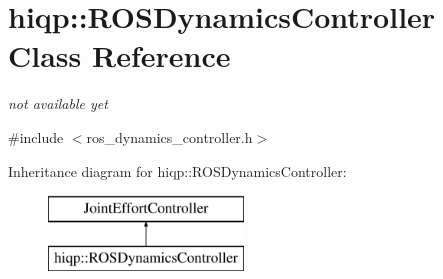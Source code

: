 \hypertarget{classhiqp_1_1ROSDynamicsController}{\section{hiqp\-:\-:R\-O\-S\-Dynamics\-Controller Class Reference}
\label{classhiqp_1_1ROSDynamicsController}
}


{\itshape not available yet}  




{\ttfamily \#include $<$ros\-\_\-dynamics\-\_\-controller.\-h$>$}

Inheritance diagram for hiqp\-:\-:R\-O\-S\-Dynamics\-Controller\-:\begin{figure}[H]
\begin{center}
\leavevmode
\includegraphics[height=2.000000cm]{classhiqp_1_1ROSDynamicsController}
\end{center}
\end{figure}
